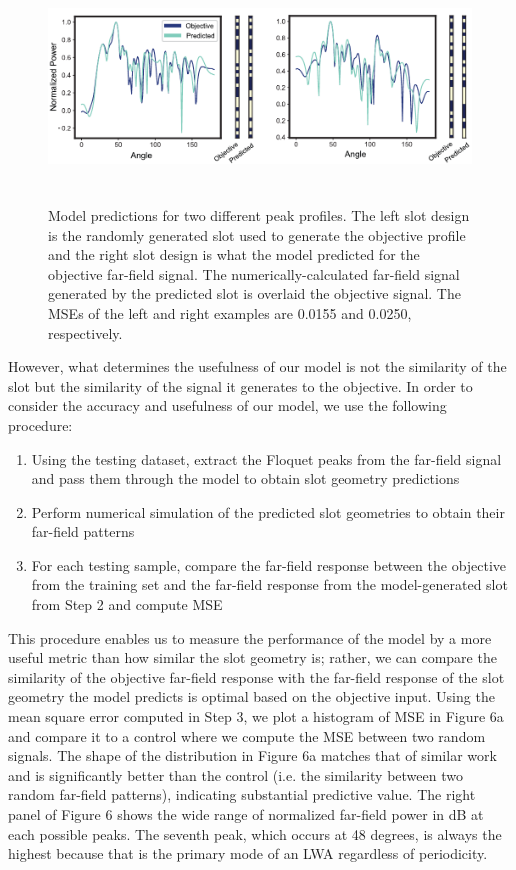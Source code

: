 \documentclass[11pt]{article}
\begin{document}
\begin{figure}[H]
	\centering
	\includegraphics[height=2.4in]{figures/binaryexamples}
	\caption{Model predictions for two different peak profiles. The left slot design is the randomly generated slot used to generate the objective profile and the right slot design is what the model predicted for the objective far-field signal. The numerically-calculated far-field signal generated by the predicted slot is overlaid the objective signal. The MSEs of the left and right examples are 0.0155 and 0.0250, respectively.}
\end{figure}

\noindent However, what determines the usefulness of our model is not the similarity of the slot but the similarity of the signal it generates to the objective. In order to consider the accuracy and usefulness of our model, we use the following procedure:

\begin{enumerate}
	\item Using the testing dataset, extract the Floquet peaks from the far-field signal and pass them through the model to obtain slot geometry predictions
	\item Perform numerical simulation of the predicted slot geometries to obtain their far-field patterns
	\item For each testing sample, compare the far-field response between the objective from the training set and the far-field response from the model-generated slot from Step 2 and compute MSE
\end{enumerate}

\noindent This procedure enables us to measure the performance of the model by a more useful metric than how similar the slot geometry is; rather, we can compare the similarity of the objective far-field response with the far-field response of the slot geometry the model predicts is optimal based on the objective input. Using the mean square error computed in Step 3, we plot a histogram of MSE in Figure 6a and compare it to a control where we compute the MSE between two random signals. The shape of the distribution in Figure 6a matches that of similar work \cite{Nadell:19} and is significantly better than the control (i.e. the similarity between two random far-field patterns), indicating substantial predictive value. The right panel of Figure 6 shows the wide range of normalized far-field power in dB at each possible peaks. The seventh peak, which occurs at 48 degrees, is always the highest because that is the primary mode of an LWA regardless of periodicity. 
\end{document}
